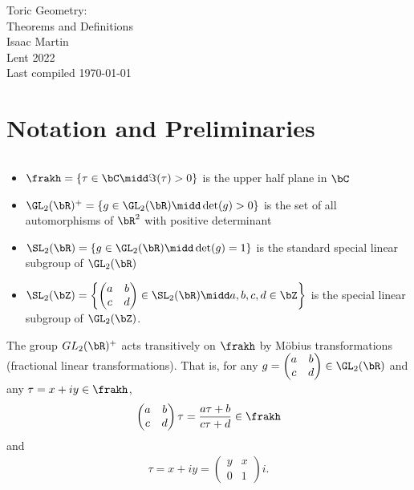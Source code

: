 


\pagestyle{empty}
	\LARGE
\begin{center}
	Toric Geometry: \\
	Theorems and Definitions \\
	
	\bigskip
	\Large
	Isaac Martin \\
	Lent 2022 \\
    Last compiled \today
\end{center}
\normalsize
\vspace{-2mm}
\hru

\tableofcontents
\newpage

\setcounter{section}{0}

\section{Notation and Preliminaries}
\begin{defn}\label{defn:basic-notation}$ $
	\begin{itemize}
		\item $\frakh = \left\{\tau \in \bC \midd \Im(\tau) > 0\right\} $ is the upper half plane in $\bC$ 
		\item $\GL_2(\bR)^+ = \left\{g \in \GL_2(\bR) \midd \det(g) > 0\right\} $ is the set of all automorphisms of $\bR^2$ with positive determinant
		\item $\SL_2(\bR) = \left\{g \in \GL_2(\bR) \midd \det (g) = 1\right\} $ is the standard special linear subgroup of $\GL_2(\bR)$
		\item $\SL_2(\bZ) = \left\{\begin{pmatrix} a & b \\ c & d \end{pmatrix} \in \SL_2(\bR) \midd a,b,c,d \in \bZ\right\} $ is the special linear subgroup of $\GL_2(\bZ)$.
	\end{itemize}
\end{defn}

\begin{lem}\label{lem:transitive-GL2-action-on-H}
	The group  $GL_2(\bR)^+$ acts transitively on $\frakh$ by M\"obius transformations (fractional linear transformations). That is, for any $g = \begin{pmatrix}a & b \\ c & d\end{pmatrix} \in \GL_2(\bR)$ and any $\tau = x + iy \in \frakh$,
	 \begin{align*}
		\begin{pmatrix}
			a & b \\
			c & d
		\end{pmatrix} \tau = \frac{a\tau + b}{c\tau + d} \in \frakh
	\end{align*}
	and 
	\begin{align*}
		\tau = x + iy = 
        \begin{pmatrix}
		    y & x \\
		    0 & 1
    	\end{pmatrix}i.
	\end{align*}
\end{lem}

